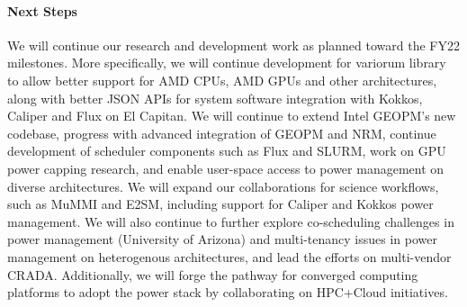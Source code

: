 \paragraph{Next Steps}
We will continue our research and development work as planned toward the FY22 milestones. More specifically, we will continue development for variorum library to allow better support for AMD CPUs, AMD GPUs and other architectures, along with better JSON APIs for system software integration with Kokkos, Caliper and Flux on El Capitan. We will continue to extend Intel GEOPM's new codebase, progress with advanced integration of GEOPM and NRM, continue development of scheduler components such as Flux and SLURM, work on GPU power capping research, and enable user-space access to power management on diverse architectures. We will expand our collaborations for science workflows, such as MuMMI and E2SM, including support for Caliper and Kokkos power management. We will also continue to further explore co-scheduling challenges in power management (University of Arizona) and multi-tenancy issues in power management on heterogenous architectures, and lead the efforts on multi-vendor CRADA. Additionally, we will forge the pathway for converged computing platforms to adopt the power stack by collaborating on HPC+Cloud initiatives. 
